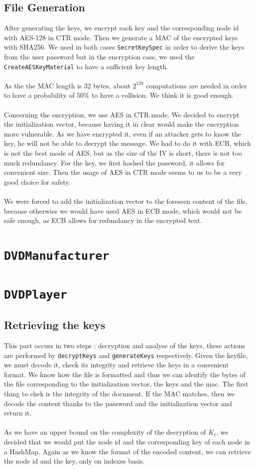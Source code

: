 \documentclass[a4paper,titlepage]{article}
\begin{document}
	\subsection{File Generation}
	After generating the keys, we encrypt each key and the corresponding node id with AES-128 in CTR mode. Then we generate a MAC of the encrypted   	keys with SHA256. We used in both cases \texttt{SecretKeySpec} in order to derive the keys from the user password but in the encryption case, we used the \texttt{CreateAESKeyMaterial} to have a sufficient key length. \\ \\ 
	As the the MAC length is 32 bytes, about $2^{128}$ computations are needed in order to have a probability of 50\% to have a collision. We think it is good enough.\\ \\
	 Concerning the encryption, we use AES in CTR mode. We decided to encrypt the initialization vector, because having it in clear would make the encryption more vulnerable. As we have encrypted it, even if an attacker gets to know the key, he will not be able to decrypt the message. We had to do it with ECB, which is not the best mode of AES, but as the size of the IV is short, there is not too much redundancy. For the key, we first hashed the password, it allows for convenient size. Then the usage of AES in CTR mode seems to us to be a very good choice for safety. \\ \\
	We were forced to add the initialization vector to the foreseen content of the file, because otherwise we would have used AES in ECB mode, which would not be safe enough, as ECB allows for redundancy in the encrypted text.

\section{\texttt{DVDManufacturer}}

\section{\texttt{DVDPlayer}}
\subsection{Retrieving the keys}
This part occurs in two steps : decryption and analyse of the keys, these actions are performed by \texttt{decryptKeys} and \texttt{generateKeys} respectively.
Given the keyfile, we must decode it, check its integrity and retrieve the keys in a convenient format. We know how the file is formatted and thus we can identify the bytes of the file corresponding to the initialization vector, the keys and the mac. The first thing to chek is the integrity of the document. If the MAC matches, then we decode the content thanks to the password and the initialization vector and return it. \\ \\

As we have an upper bound on the complexity of the decryption of $K_t$, we decided that we would put the node id and the corresponding key of each node in a HashMap. Again as we know the format of the encoded content, we can retrieve the node id and the key, only on indexes basis.
\end{document}
